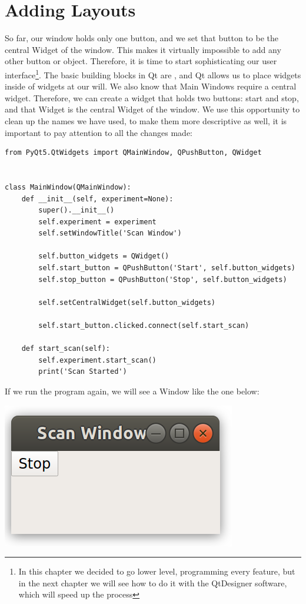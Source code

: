 \section{Adding Layouts}\label{sec:adding-layouts}
So far, our window holds only one button, and we set that button to be the central Widget of the window. This makes it virtually impossible to add any other button or object. Therefore, it is time to start sophisticating our user interface\footnote{In this chapter we decided to go lower level, programming every feature, but in the next chapter we will see how to do it with the QtDesigner software, which will speed up the process}. The basic building blocks in Qt are , and Qt allows us to place widgets inside of widgets at our will. We also know that Main Windows require a central widget. Therefore, we can create a widget that holds two buttons: start and stop, and that Widget is the central Widget of the window. We use this opportunity to clean up the names we have used, to make them more descriptive as well, it is important to pay attention to all the changes made:

\begin{verbatim}
from PyQt5.QtWidgets import QMainWindow, QPushButton, QWidget


class MainWindow(QMainWindow):
    def __init__(self, experiment=None):
        super().__init__()
        self.experiment = experiment
        self.setWindowTitle('Scan Window')

        self.button_widgets = QWidget()
        self.start_button = QPushButton('Start', self.button_widgets)
        self.stop_button = QPushButton('Stop', self.button_widgets)

        self.setCentralWidget(self.button_widgets)

        self.start_button.clicked.connect(self.start_scan)

    def start_scan(self):
        self.experiment.start_scan()
        print('Scan Started')
\end{verbatim}

If we run the program again, we will see a Window like the one below:

\begin{center}
    \includegraphics[width=.3\textwidth]{images/Chapter_08/05_window_without_layout.png}
\end{center}

